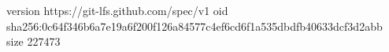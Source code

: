 version https://git-lfs.github.com/spec/v1
oid sha256:0c64f346b6a7e19a6f200f126a84577c4ef6cd6f1a535dbdfb40633dcf3d2abb
size 227473
